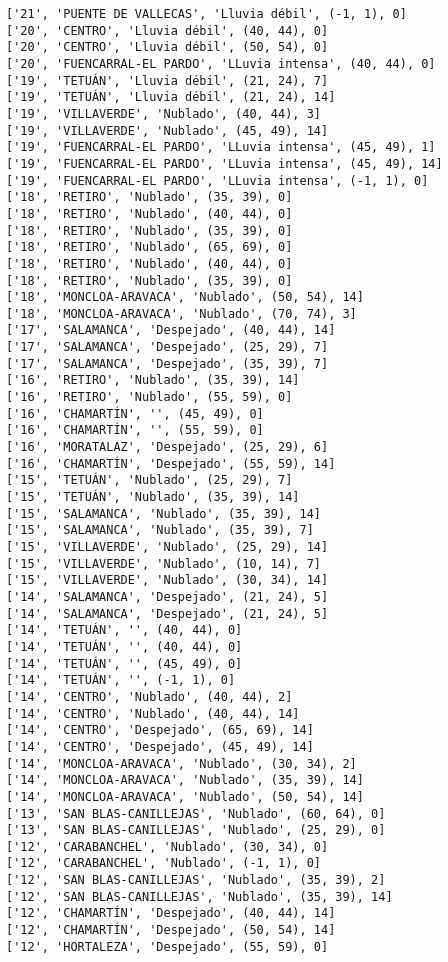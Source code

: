 \documentclass[11pt]{article}
\begin{document}
\begin{Verbatim}[commandchars=\\\{\}]
['21', 'PUENTE DE VALLECAS', 'Lluvia débil', (-1, 1), 0]
['20', 'CENTRO', 'Lluvia débil', (40, 44), 0]
['20', 'CENTRO', 'Lluvia débil', (50, 54), 0]
['20', 'FUENCARRAL-EL PARDO', 'LLuvia intensa', (40, 44), 0]
['19', 'TETUÁN', 'Lluvia débil', (21, 24), 7]
['19', 'TETUÁN', 'Lluvia débil', (21, 24), 14]
['19', 'VILLAVERDE', 'Nublado', (40, 44), 3]
['19', 'VILLAVERDE', 'Nublado', (45, 49), 14]
['19', 'FUENCARRAL-EL PARDO', 'LLuvia intensa', (45, 49), 1]
['19', 'FUENCARRAL-EL PARDO', 'LLuvia intensa', (45, 49), 14]
['19', 'FUENCARRAL-EL PARDO', 'LLuvia intensa', (-1, 1), 0]
['18', 'RETIRO', 'Nublado', (35, 39), 0]
['18', 'RETIRO', 'Nublado', (40, 44), 0]
['18', 'RETIRO', 'Nublado', (35, 39), 0]
['18', 'RETIRO', 'Nublado', (65, 69), 0]
['18', 'RETIRO', 'Nublado', (40, 44), 0]
['18', 'RETIRO', 'Nublado', (35, 39), 0]
['18', 'MONCLOA-ARAVACA', 'Nublado', (50, 54), 14]
['18', 'MONCLOA-ARAVACA', 'Nublado', (70, 74), 3]
['17', 'SALAMANCA', 'Despejado', (40, 44), 14]
['17', 'SALAMANCA', 'Despejado', (25, 29), 7]
['17', 'SALAMANCA', 'Despejado', (35, 39), 7]
['16', 'RETIRO', 'Nublado', (35, 39), 14]
['16', 'RETIRO', 'Nublado', (55, 59), 0]
['16', 'CHAMARTÍN', '', (45, 49), 0]
['16', 'CHAMARTÍN', '', (55, 59), 0]
['16', 'MORATALAZ', 'Despejado', (25, 29), 6]
['16', 'CHAMARTÍN', 'Despejado', (55, 59), 14]
['15', 'TETUÁN', 'Nublado', (25, 29), 7]
['15', 'TETUÁN', 'Nublado', (35, 39), 14]
['15', 'SALAMANCA', 'Nublado', (35, 39), 14]
['15', 'SALAMANCA', 'Nublado', (35, 39), 7]
['15', 'VILLAVERDE', 'Nublado', (25, 29), 14]
['15', 'VILLAVERDE', 'Nublado', (10, 14), 7]
['15', 'VILLAVERDE', 'Nublado', (30, 34), 14]
['14', 'SALAMANCA', 'Despejado', (21, 24), 5]
['14', 'SALAMANCA', 'Despejado', (21, 24), 5]
['14', 'TETUÁN', '', (40, 44), 0]
['14', 'TETUÁN', '', (40, 44), 0]
['14', 'TETUÁN', '', (45, 49), 0]
['14', 'TETUÁN', '', (-1, 1), 0]
['14', 'CENTRO', 'Nublado', (40, 44), 2]
['14', 'CENTRO', 'Nublado', (40, 44), 14]
['14', 'CENTRO', 'Despejado', (65, 69), 14]
['14', 'CENTRO', 'Despejado', (45, 49), 14]
['14', 'MONCLOA-ARAVACA', 'Nublado', (30, 34), 2]
['14', 'MONCLOA-ARAVACA', 'Nublado', (35, 39), 14]
['14', 'MONCLOA-ARAVACA', 'Nublado', (50, 54), 14]
['13', 'SAN BLAS-CANILLEJAS', 'Nublado', (60, 64), 0]
['13', 'SAN BLAS-CANILLEJAS', 'Nublado', (25, 29), 0]
['12', 'CARABANCHEL', 'Nublado', (30, 34), 0]
['12', 'CARABANCHEL', 'Nublado', (-1, 1), 0]
['12', 'SAN BLAS-CANILLEJAS', 'Nublado', (35, 39), 2]
['12', 'SAN BLAS-CANILLEJAS', 'Nublado', (35, 39), 14]
['12', 'CHAMARTÍN', 'Despejado', (40, 44), 14]
['12', 'CHAMARTÍN', 'Despejado', (50, 54), 14]
['12', 'HORTALEZA', 'Despejado', (55, 59), 0]

\end{Verbatim}
\end{document}
